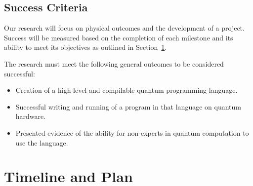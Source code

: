 \documentclass[journal,onecolumn, compsoc]{IEEEtran}
\begin{document}
\subsection{Success Criteria}
Our research will focus on physical outcomes and the development of a project.
Success will be measured based on the completion of each milestone and its ability to meet its objectives as outlined in Section~\ref{sec:timeline-plan}.

The research must meet the following general outcomes to be considered successful:
\begin{itemize}
    \item Creation of a high-level and compilable quantum programming language.
    \item Successful writing and running of a program in that language on quantum hardware.
    \item Presented evidence of the ability for non-experts in quantum computation to use the language.
\end{itemize}

\section{Timeline and Plan}\label{sec:timeline-plan}
\end{document}
